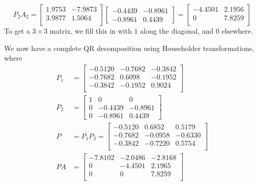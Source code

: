 \begin{equation*}
    P_2 A_2 = \begin{bmatrix}
        1.9753 & -7.9873 \\
        3.9877 & 1.5064 \\
    \end{bmatrix}\begin{bmatrix}
        -0.4439 & -0.8961 \\
        -0.8961 & 0.4439
    \end{bmatrix} = \begin{bmatrix}
        -4.4501 & 2.1956 \\
        0 & 7.8259 \\
    \end{bmatrix}
\end{equation*}
To get a $3 \times 3$ matrix, we fill this in with $1$ along the diagonal, and $0$ elsewhere.

We now have a complete QR decomposition using Householder transformations, where
\begin{align*}
    P_1 &= \begin{bmatrix}
        -0.5120 & -0.7682 & -0.3842 \\
        -0.7682 & 0.6098 & -0.1952 \\
        -0.3842 & -0.1952 & 0.9024 \\
    \end{bmatrix} \\
    P_2 &= \begin{bmatrix}
        1 & 0 & 0 \\
        0 & -0.4439 & -0.8961 \\
        0 & -0.8961 & 0.4439
    \end{bmatrix} \\
    P &= P_1 P_2 = \begin{bmatrix}
        -0.5120 & 0.6852 & 0.5179 \\
        -0.7682 & -0.0958 & -0.6330 \\
        -0.3842 & -0.7220 & 0.5754 \\
    \end{bmatrix} \\
    PA &= \begin{bmatrix}
        -7.8102 & -2.0486 & -2.8168 \\
        0 &  -4.4501 & 2.1965 \\
        0 & 0 & 7.8259 \\
    \end{bmatrix}
\end{align*}
